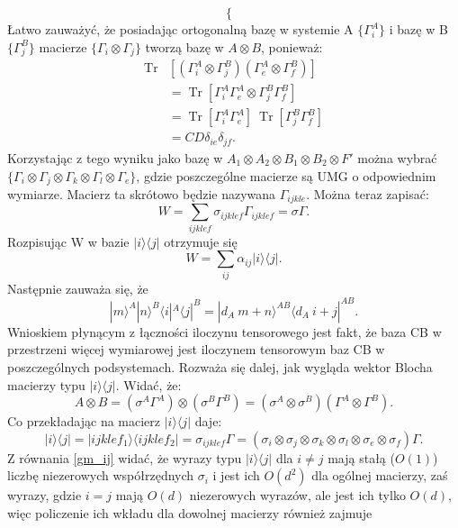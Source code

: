\documentclass[10pt]{article} %
\DeclareMathOperator{\Trs}{Tr}
\newcommand{\Ket}[1]{|#1\rangle}
\newcommand{\Bra}[1]{\langle#1|}
\begin{document}
\begin{appendices}
\begin{equation}
\begin{cases}
\end{cases}
\end{equation}
Łatwo zauważyć, że posiadając ortogonalną bazę w systemie A $\{\Gamma_i^A\}$ i bazę w B $\{ \Gamma_j^B \}$ macierze $\{\Gamma_i \otimes \Gamma_j\}$ tworzą bazę w $A \otimes B$, ponieważ:
\begin{align}
\Trs& \left[ (\Gamma_i^A \otimes \Gamma_j^B) (\Gamma_e^A \otimes \Gamma_f^B)\right] \\
&= \Trs \left[ \Gamma_i^A \Gamma_e^A \otimes \Gamma_j^B \Gamma_f^B \right] \\
&= \Trs \left[ \Gamma_i^A \Gamma_e^A\right] ~\Trs \left[\Gamma_j^B \Gamma_f^B\right] \\
&= CD \delta_{ie} \delta_{jf}.
\end{align}
Korzystając z tego wyniku jako bazę w $A_1 \otimes A_2 \otimes B_1 \otimes B_2 \otimes F'$ można wybrać $\{ \Gamma_i \otimes \Gamma_j \otimes \Gamma_k \otimes \Gamma_l \otimes \Gamma_e\}$, gdzie poszczególne macierze są UMG o odpowiednim wymiarze. Macierz ta skrótowo będzie nazywana $\Gamma_{ijkle}$.
Można teraz zapisać:
\begin{equation}
\label{WGM}
W = \sum_{ijklef} \sigma_{ijklef} \Gamma_{ijklef} = \sigma \Gamma.
\end{equation}
Rozpisując W w bazie $\Ket{i}\Bra{j}$ otrzymuje się
\begin{equation}
W = \sum_{ij} \alpha_{ij} \Ket{i}\Bra{j}.
\end{equation}
Następnie zauważa się, że
\begin{equation}
\Ket{m}^A\Ket{n}^B\Bra{i}^A\Bra{j}^B = \Ket{d_A~m+n}^{AB}\Bra{d_A~i+j}^{AB}.
\end{equation} Wnioskiem płynącym z łączności iloczynu tensorowego jest fakt, że baza CB w przestrzeni więcej wymiarowej jest iloczynem tensorowym baz CB w poszczególnych podsystemach.
Rozważa się dalej, jak wygląda wektor Blocha macierzy typu $\Ket{i}\Bra{j}$.
Widać, że:
\begin{equation}
A \otimes B = (\sigma^A \Gamma^A) \otimes (\sigma^B \Gamma^B) = (\sigma^A \otimes \sigma^B) (\Gamma^A \otimes \Gamma^B).
\end{equation} Co przekładając na macierz $\Ket{i}\Bra{j}$ daje:
\begin{equation}
\Ket{i}\Bra{j}=\Ket{ijklef_1}\Bra{ijklef_2} =  \sigma_{ijklef} \Gamma = (\sigma_i \otimes \sigma_j \otimes \sigma_k \otimes \sigma_l \otimes \sigma_e \otimes \sigma_f) \Gamma.
\end{equation}
Z równania \eqref{gm_ij} widać, że wyrazy typu $\Ket{i}\Bra{j}$ dla $i \neq j$ mają stałą ($O(1)$) liczbę niezerowych współrzędnych $\sigma_i$ i jest ich $O(d^2)$ dla ogólnej macierzy, zaś wyrazy, gdzie $i = j$ mają $O(d)$ niezerowych wyrazów, ale jest ich tylko $O(d)$, więc policzenie ich wkładu dla dowolnej macierzy również zajmuje 

\end{appendices}
\end{document}
